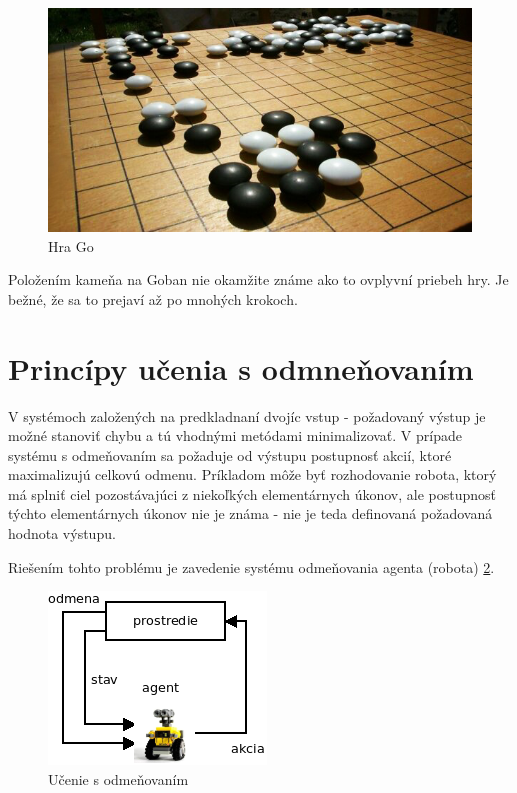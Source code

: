 \begin{figure}[!htb]
\center
\includegraphics[scale=.5]{../pictures/go2.jpg}
\caption{Hra Go}
\label{img:go_game}
\end{figure}

Položením kameňa na Goban nie okamžite známe ako to ovplyvní priebeh hry.
Je bežné, že sa to prejaví až po mnohých krokoch.


\section{Princípy učenia s odmneňovaním}

V systémoch založených na predkladnaní dvojíc vstup - požadovaný výstup
je možné stanoviť chybu a tú vhodnými metódami minimalizovať.
V prípade systému s odmeňovaním sa požaduje od výstupu postupnosť
akcií, ktoré maximalizujú celkovú odmenu.
Príkladom môže byť rozhodovanie robota, ktorý má splniť ciel pozostávajúci z
niekoľkých elementárnych úkonov, ale postupnosť týchto elementárnych úkonov nie je známa -
nie je teda definovaná požadovaná hodnota výstupu.

Riešením tohto problému je zavedenie systému odmeňovania agenta (robota) \ref{img:reinforcement_learning}.

\begin{figure}[!htb]
\center
\includegraphics[scale=.8]{../diagrams/agent.png}
\caption{Učenie s odmeňovaním}
\label{img:reinforcement_learning}
\end{figure}

